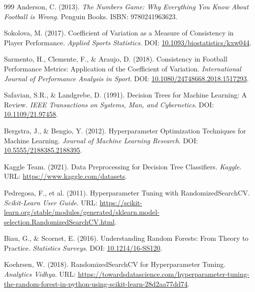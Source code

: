 \documentclass[12pt, a4paper,oneside]{book}
\numberwithin{equation}{section}
\begin{document}
\begin{thebibliography}{999}
Anderson, C. (2013). \textit{The Numbers Game: Why Everything You Know About Football is Wrong}. Penguin Books. ISBN: 9780241963623.

Sokolova, M. (2017). Coefficient of Variation as a Measure of Consistency in Player Performance. \textit{Applied Sports Statistics}. DOI: \href{https://doi.org/10.1093/biostatistics/kxw044}{10.1093/biostatistics/kxw044}.

Sarmento, H., Clemente, F., \& Araujo, D. (2018). Consistency in Football Performance Metrics: Application of the Coefficient of Variation. \textit{International Journal of Performance Analysis in Sport}. DOI: \href{https://doi.org/10.1080/24748668.2018.1517293}{10.1080/24748668.2018.1517293}.

Safavian, S.R., \& Landgrebe, D. (1991). Decision Trees for Machine Learning: A Review. \textit{IEEE Transactions on Systems, Man, and Cybernetics}. DOI: \href{https://doi.org/10.1109/21.97458}{10.1109/21.97458}.

Bergstra, J., \& Bengio, Y. (2012). Hyperparameter Optimization Techniques for Machine Learning. \textit{Journal of Machine Learning Research}. DOI: \href{https://doi.org/10.5555/2188385.2188395}{10.5555/2188385.2188395}.

Kaggle Team. (2021). Data Preprocessing for Decision Tree Classifiers. \textit{Kaggle}. URL: \href{https://www.kaggle.com/datasets}{https://www.kaggle.com/datasets}.

Pedregosa, F., et al. (2011). Hyperparameter Tuning with RandomizedSearchCV. \textit{Scikit-Learn User Guide}. URL: \href{https://scikit-learn.org/stable/modules/generated/sklearn.model_selection.RandomizedSearchCV.html}{https://scikit-learn.org/stable/modules/generated/sklearn.model-selection.RandomizedSearchCV.html}.

Biau, G., \& Scornet, E. (2016). Understanding Random Forests: From Theory to Practice. \textit{Statistics Surveys}. DOI: \href{https://doi.org/10.1214/16-SS120}{10.1214/16-SS120}.

Koehrsen, W. (2018). RandomizedSearchCV for Hyperparameter Tuning. \textit{Analytics Vidhya}. URL: \href{https://towardsdatascience.com/hyperparameter-tuning-the-random-forest-in-python-using-scikit-learn-28d2aa77dd74}{https://towardsdatascience.com/hyperparameter-tuning-the-random-forest-in-python-using-scikit-learn-28d2aa77dd74}.


\end{thebibliography}
\end{document}

